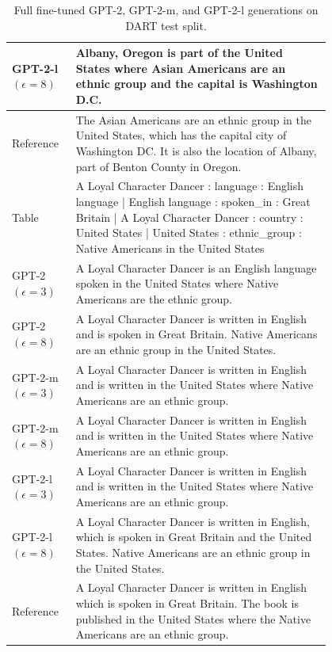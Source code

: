 \begin{table}[h]
\begin{tabular}{l | p{0.8\linewidth}}
GPT-2-l $(\epsilon=8)$ & Albany, Oregon is part of the United States where Asian Americans are an ethnic group and the capital is Washington D.C. \\
\hline
 Reference & The Asian Americans are an ethnic group in the United States, which has the capital city of Washington DC. It is also the location of Albany, part of Benton County in Oregon. \\
\midrule\midrule
Table & A Loyal Character Dancer : language : English language | English language : spoken\_in : Great Britain | A Loyal Character Dancer : country : United States | United States : ethnic\_group : Native Americans in the United States  \\
 \hline
GPT-2 $(\epsilon=3)$ & A Loyal Character Dancer is an English language spoken in the United States where Native Americans are the ethnic group. \\
GPT-2 $(\epsilon=8)$ & A Loyal Character Dancer is written in English and is spoken in Great Britain. Native Americans are an ethnic group in the United States. \\
GPT-2-m $(\epsilon=3)$ & A Loyal Character Dancer is written in English and is written in the United States where Native Americans are an ethnic group. \\
GPT-2-m $(\epsilon=8)$ & A Loyal Character Dancer is written in English and is written in the United States where Native Americans are an ethnic group. \\
GPT-2-l $(\epsilon=3)$ & A Loyal Character Dancer is written in English and is written in the United States where Native Americans are an ethnic group. \\
GPT-2-l $(\epsilon=8)$ & A Loyal Character Dancer is written in English, which is spoken in Great Britain and the United States. Native Americans are an ethnic group in the United States. \\
\hline
 Reference & A Loyal Character Dancer is written in English which is spoken in Great Britain. The book is published in the United States where the Native Americans are an ethnic group. \\
\bottomrule
\end{tabular}
\caption{\small Full fine-tuned GPT-2, GPT-2-m, and GPT-2-l generations on DART test split.}
\end{table}


